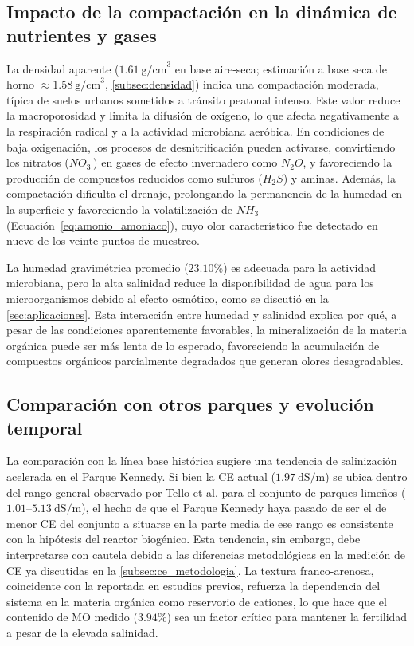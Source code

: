 \documentclass[fleqn]{jaes}
\begin{document}
\subsection{Impacto de la compactación en la dinámica de nutrientes y gases}

La densidad aparente ($1.61~\text{g/cm}^3$ en base aire-seca; estimación a base seca de horno $\approx 1.58~\text{g/cm}^3$, \cref{subsec:densidad}) indica una compactación moderada, típica de suelos urbanos sometidos a tránsito peatonal intenso. Este valor reduce la macroporosidad y limita la difusión de oxígeno, lo que afecta negativamente a la respiración radical y a la actividad microbiana aeróbica. En condiciones de baja oxigenación, los procesos de desnitrificación pueden activarse, convirtiendo los nitratos ($NO_3^-$) en gases de efecto invernadero como $N_2O$, y favoreciendo la producción de compuestos reducidos como sulfuros ($H_2S$) y aminas. Además, la compactación dificulta el drenaje, prolongando la permanencia de la humedad en la superficie y favoreciendo la volatilización de $NH_3$ (Ecuación~\ref{eq:amonio_amoniaco}), cuyo olor característico fue detectado en nueve de los veinte puntos de muestreo.

La humedad gravimétrica promedio ($23.10\%$) es adecuada para la actividad microbiana, pero la alta salinidad reduce la disponibilidad de agua para los microorganismos debido al efecto osmótico, como se discutió en la \cref{sec:aplicaciones}. Esta interacción entre humedad y salinidad explica por qué, a pesar de las condiciones aparentemente favorables, la mineralización de la materia orgánica puede ser más lenta de lo esperado, favoreciendo la acumulación de compuestos orgánicos parcialmente degradados que generan olores desagradables.

\subsection{Comparación con otros parques y evolución temporal}

La comparación con la línea base histórica sugiere una tendencia de salinización acelerada en el Parque Kennedy. Si bien la CE actual ($1.97~\text{dS/m}$) se ubica dentro del rango general observado por Tello et al. \cite{Tello2018} para el conjunto de parques limeños ($1.01$--$5.13~\text{dS/m}$), el hecho de que el Parque Kennedy haya pasado de ser el de menor CE del conjunto a situarse en la parte media de ese rango es consistente con la hipótesis del reactor biogénico. Esta tendencia, sin embargo, debe interpretarse con cautela debido a las diferencias metodológicas en la medición de CE ya discutidas en la \cref{subsec:ce_metodologia}. La textura franco-arenosa, coincidente con la reportada en estudios previos, refuerza la dependencia del sistema en la materia orgánica como reservorio de cationes, lo que hace que el contenido de MO medido ($3.94\%$) sea un factor crítico para mantener la fertilidad a pesar de la elevada salinidad.
\end{document}
